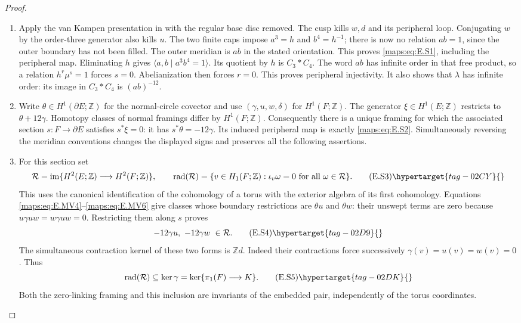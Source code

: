 \begin{proof}
\begin{enumerate}[label={$\langle1\rangle$\arabic*.},leftmargin=*]
\item Apply the van Kampen presentation in  with the regular base disc
removed. The cusp kills $w,d$ and its peripheral loop. Conjugating
$w$ by the order-three generator also kills $u$. The two finite caps
impose $a^3=h$ and $b^4=h^{-1}$; there is now no relation $ab=1$,
since the outer boundary has not been filled. The outer meridian
is $ab$ in the stated orientation. This proves \eqref{maps:eq:E.S1}, including the peripheral map. Eliminating $h$ gives $\langle a,b\mid a^3b^4=1\rangle$.
Its quotient by $h$ is $C_3*C_4$. The word $ab$ has infinite order
in that free product, so a relation $h^r\mu^s=1$ forces $s=0$.
Abelianization then forces $r=0$. This proves peripheral injectivity.
It also shows that $\lambda$ has infinite order: its image in
$C_3*C_4$ is $(ab)^{-12}$.

\item Write $\theta\in H^1(\partial E;\mathbb Z)$ for the normal-circle
covector and use $(\gamma,u,w,\delta)$ for $H^1(F;\mathbb Z)$.
The generator $\xi\in H^1(E;\mathbb Z)$ restricts to
$\theta+12\gamma$. Homotopy classes of normal framings differ by
$H^1(F;\mathbb Z)$. Consequently there is a unique framing for
which the associated section $s:F\to\partial E$ satisfies
$s^*\xi=0$: it has $s^*\theta=-12\gamma$. Its induced peripheral
map is exactly \eqref{maps:eq:E.S2}. Simultaneously reversing the meridian
conventions changes the displayed signs and preserves all the
following assertions.

\item For this section set
\[
 \mathcal R=\operatorname{im}\{H^2(E;\mathbb Z)
                         \longrightarrow H^2(F;\mathbb Z)\},
 \qquad
 \operatorname{rad}(\mathcal R)=
 \{v\in H_1(F;\mathbb Z):\iota_v\omega=0
                                    \text{ for all }\omega\in\mathcal R\}.
 \tag{E.S3}\hypertarget{tag-02CY}{}\label{maps:eq:E.S3}
\]
This uses the canonical identification of the cohomology of a torus
with the exterior algebra of its first cohomology. Equations
\eqref{maps:eq:E.MV4}--\eqref{maps:eq:E.MV6} give classes whose boundary restrictions are
$\theta u$ and $\theta w$: their unswept terms are zero because
$u\gamma uw=w\gamma uw=0$. Restricting them along $s$ proves
\[
                -12\gamma u,\ -12\gamma w\ \in\mathcal R.
 \tag{E.S4}\hypertarget{tag-02D9}{}\label{maps:eq:E.S4}
\]
The simultaneous contraction kernel of these two forms is
$\mathbb Z d$. Indeed their contractions force successively
$\gamma(v)=u(v)=w(v)=0$. Thus
\[
       \operatorname{rad}(\mathcal R)\subseteq\ker\gamma
        =\ker\{\pi_1(F)\longrightarrow K\}.
 \tag{E.S5}\hypertarget{tag-02DK}{}\label{maps:eq:E.S5}
\]
Both the zero-linking framing and this inclusion are invariants of
the embedded pair, independently of the torus coordinates.


\end{enumerate}
\end{proof}

